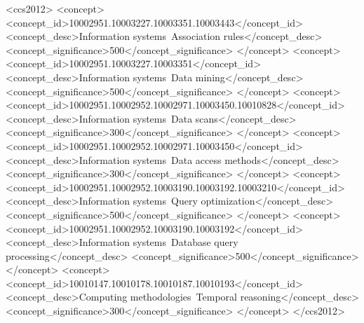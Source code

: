 \documentclass[sigconf]{acmart}
\begin{document}
\begin{CCSXML}
	<ccs2012>
	<concept>
	<concept_id>10002951.10003227.10003351.10003443</concept_id>
	<concept_desc>Information systems~Association rules</concept_desc>
	<concept_significance>500</concept_significance>
	</concept>
	<concept>
	<concept_id>10002951.10003227.10003351</concept_id>
	<concept_desc>Information systems~Data mining</concept_desc>
	<concept_significance>500</concept_significance>
	</concept>
	<concept>
	<concept_id>10002951.10002952.10002971.10003450.10010828</concept_id>
	<concept_desc>Information systems~Data scans</concept_desc>
	<concept_significance>300</concept_significance>
	</concept>
	<concept>
	<concept_id>10002951.10002952.10002971.10003450</concept_id>
	<concept_desc>Information systems~Data access methods</concept_desc>
	<concept_significance>300</concept_significance>
	</concept>
	<concept>
	<concept_id>10002951.10002952.10003190.10003192.10003210</concept_id>
	<concept_desc>Information systems~Query optimization</concept_desc>
	<concept_significance>500</concept_significance>
	</concept>
	<concept>
	<concept_id>10002951.10002952.10003190.10003192</concept_id>
	<concept_desc>Information systems~Database query processing</concept_desc>
	<concept_significance>500</concept_significance>
	</concept>
	<concept>
	<concept_id>10010147.10010178.10010187.10010193</concept_id>
	<concept_desc>Computing methodologies~Temporal reasoning</concept_desc>
	<concept_significance>300</concept_significance>
	</concept>
	</ccs2012>
\end{CCSXML}


\end{document}
